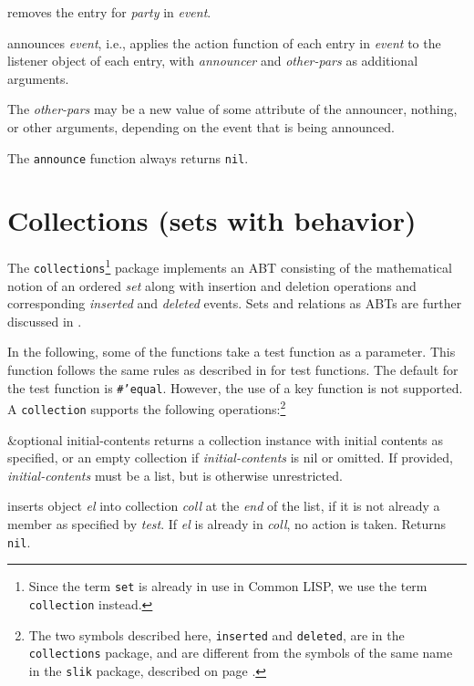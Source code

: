 \documentclass[twoside,openright,11pt]{report}
\newcommand{\tp}[1]{\texttt{#1}}
\begin{document}
{removes the entry for \emph{party} in \emph{event}.}

{announces \emph{event}, i.e., applies the action function of each
entry in \emph{event} to the listener object of each entry, with
\emph{announcer} and \emph{other-pars} as additional arguments.}

The \emph{other-pars} may be a new value of some attribute of the
announcer, nothing, or other arguments, depending on the event that is
being announced.

The \tp{announce} function always returns \tp{nil}.

\section{Collections (sets with behavior)} \label{sec:collections}

The \tp{collections}\footnote{Since the term \tp{set} is already in
use in Common LISP, we use the term \tp{collection} instead.} package
implements an ABT consisting of the mathematical notion of an ordered
\emph{set} along with insertion and deletion operations and
corresponding \emph{inserted} and \emph{deleted} events.  Sets and
relations as ABTs are further discussed in \cite{sullivan92}.

In the following, some of the functions take a test function as a
parameter.  This function follows the same rules as described in
\cite[pp. 388--391]{steele90} for test functions.  The default for the
test function is \tp{\#'equal}.  However, the use of a key function is
not supported.  A \tp{collection} supports the following
operations:\footnote{The two symbols described here, \tp{inserted} and
\tp{deleted}, are in the \tp{collections} package, and are different
from the symbols of the same name in the \tp{slik} package, described
on page \pageref{sec:scrolling-list}.}

{\&optional initial-contents}
{returns a collection instance with initial contents as specified, or
an empty collection if \emph{initial-contents} is nil or omitted.  If
provided, \emph{initial-contents} must be a list, but is otherwise
unrestricted.}

{inserts object \emph{el} into collection \emph{coll} at the
\emph{end} of the list, if it is not already a member as specified by
\emph{test}.  If \emph{el} is already in \emph{coll}, no action is
taken.  Returns \tp{nil}.}
\end{document}
